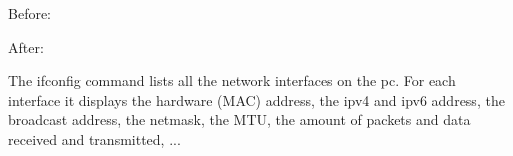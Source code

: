 Before: \newline

\newline
After: \newline


\newline
The ifconfig command lists all the network interfaces on the pc. For each interface it displays the hardware (MAC) address, the ipv4 and ipv6 address, the broadcast address, the netmask, the MTU, the amount of packets and data received and transmitted, ...